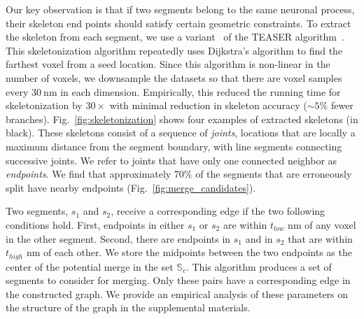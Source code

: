 Our key observation is that if two segments belong to the same neuronal process, their skeleton end points should satisfy certain geometric constraints.
To extract the skeleton from each segment, we use a variant~\cite{zhao2014automatic} of the TEASER algorithm~\cite{sato2000teasar}. 
This skeletonization algorithm repeatedly uses Dijkstra's algorithm to find the farthest voxel from a seed location. 
Since this algorithm is non-linear in the number of voxels, we downsample the datasets so that there are voxel samples every $\SI{30}{\nano\meter}$ in each dimension.
Empirically, this reduced the running time for skeletonization by $30\times$ with minimal reduction in skeleton accuracy (${\sim}5\%$ fewer branches). 
Fig.~\ref{fig:skeletonization} shows four examples of extracted skeletons (in black). 
These skeletons consist of a sequence of \textit{joints}, locations that are locally a maximum distance from the segment boundary, with line segments connecting successive joints. 
We refer to joints that have only one connected neighbor as \textit{endpoints}. 
We find that approximately 70\% of the segments that are erroneously split have nearby endpoints (Fig.~\ref{fig:merge_candidates}). 

Two segments, $s_1$ and $s_2$, receive a corresponding edge if the two following conditions hold.
First, endpoints in either $s_1$ or $s_2$ are within $t_{low}$ nm of any voxel in the other segment.
Second, there are endpoints in $s_1$ and in $s_2$ that are within $t_{high}$ nm of each other.
We store the midpoints between the two endpoints as the center of the potential merge in the set $\mathbb{S}_c$. 
This algorithm produces a set of segments to consider for merging. 
Only these pairs have a corresponding edge in the constructed graph.
We provide an empirical analysis of these parameters on the structure of the graph in the supplemental materials.

